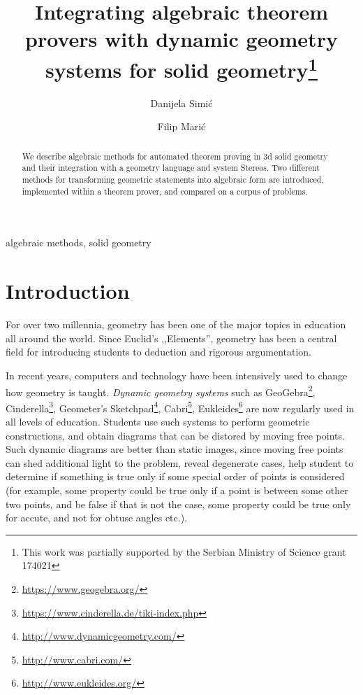 \documentclass[final,1p,times,authoryear]{elsarticle}
\begin{document}
\begin{frontmatter}

\title{Integrating algebraic theorem provers with dynamic geometry
  systems for solid geometry\footnote{This work was partially
    supported by the Serbian Ministry of Science grant 174021}}

\author{Danijela Simi\' c}
\address{School of Mathematics, University of Belgrade, Studentski trg 16, 11000, Belgrade, Serbia}

\author{Filip Mari\' c}
\address{School of Mathematics, University of Belgrade, Studentski trg 16, 11000, Belgrade, Serbia}
\begin{abstract}
  We describe algebraic methods for automated theorem proving in 3d
  solid geometry and their integration with a geometry language and
  system Stereos. Two different methods for transforming geometric
  statements into algebraic form are introduced, implemented within a
  theorem prover, and compared on a corpus of problems.
\end{abstract}

\begin{keyword}
algebraic methods, solid geometry
\end{keyword}
\end{frontmatter}


\section{Introduction}
For over two millennia, geometry has been one of the major topics in
education all around the world. Since Euclid's ,,Elements'', geometry
has been a central field for introducing students to deduction and
rigorous argumentation. 

In recent years, computers and technology have been intensively used
to change how geometry is taught. \emph{Dynamic geometry systems} such
as GeoGebra\footnote{\url{https://www.geogebra.org/}},
Cinderella\footnote{\url{https://www.cinderella.de/tiki-index.php}},
Geometer's Sketchpad\footnote{\url{http://www.dynamicgeometry.com/}},
Cabri\footnote{\url{http://www.cabri.com/}},
Eukleides\footnote{\url{http://www.eukleides.org/}} are now regularly
used in all levels of education. Students use such systems to perform
geometric constructions, and obtain diagrams that can be distored by
moving free points. Such dynamic diagrams are better than static
images, since moving free points can shed additional light to the
problem, reveal degenerate cases, help student to determine if
something is true only if some special order of points is considered
(for example, some property could be true only if a point is between
some other two points, and be false if that is not the case, some
property could be true only for accute, and not for obtuse angles
etc.).
\end{document}
